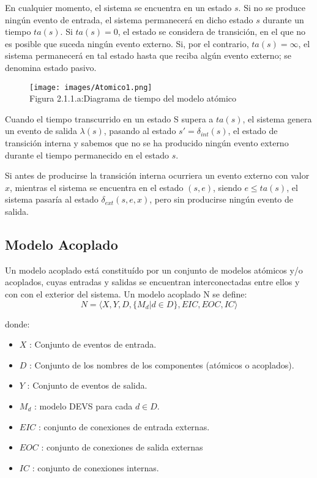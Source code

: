 En cualquier momento, el sistema se encuentra en un estado $s$. Si no se produce ningún evento de entrada, el sistema permanecerá en dicho estado $s$ durante un tiempo $ta(s)$. Si $ta(s)=0$, el estado se considera de transición, en el que no es posible que suceda ningún evento externo. Si, por el contrario, $ta(s)=\infty$, el sistema permanecerá en tal estado hasta que reciba algún evento externo; se denomina estado pasivo.

\begin{figure}[H]
\begin{center}
\texttt{[image: images/Atomico1.png]}\\[0.5cm]
Figura 2.1.1.a:Diagrama de tiempo del modelo atómico
\end{center}
\end{figure}

Cuando el tiempo transcurrido en un estado S supera a $ta(s)$, el sistema genera un evento de salida $\lambda(s)$, pasando al estado $s'=\delta_{int}(s)$, el estado de transición interna y sabemos que no se ha producido ningún evento externo durante el tiempo permanecido en el estado $s$.

Si antes de producirse la transición interna ocurriera un evento externo con valor $x$, mientras el sistema se encuentra en el estado $(s,e)$, siendo $e \leq ta(s)$, el sistema pasaría al estado $\delta_{ext}(s,e,x)$, pero sin producirse ningún evento de salida.

\subsection{Modelo Acoplado}

Un modelo acoplado está constituído por un conjunto de modelos atómicos y/o acoplados, cuyas entradas y salidas se encuentran interconectadas entre ellos y con con el exterior del sistema.
Un modelo acoplado N se define:
\begin{equation}\label{eq:DevsAcoplado}
N = \langle X,Y,D,\{M_{d}|d \in D\},EIC,EOC,IC\rangle
\end{equation}

\noindent donde:

\begin{itemize}
\item $X$ : Conjunto de eventos de entrada.	
\item $D$ : Conjunto de los nombres de los componentes (atómicos o acoplados).
\item $Y$ : Conjunto de eventos de salida.
\item $M_{d}$ : modelo DEVS para cada $d \in D$.
\item $EIC$ : conjunto de conexiones de entrada externas.
\item $EOC$ : conjunto de conexiones de salida externas
\item $IC$ : conjunto de conexiones internas.
\end{itemize}


